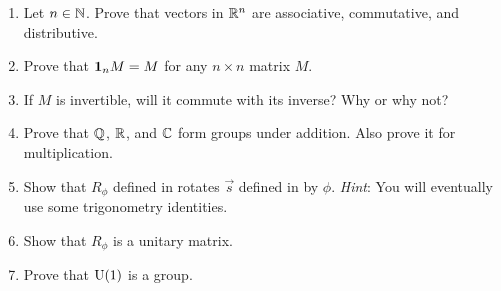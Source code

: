 \begin{enumerate} 
  \item Let $n\in\mathbb{N}$. Prove that vectors in $\mathbb{R}^n$ are associative, commutative,
        and distributive.
  \item Prove that ${\mathbf 1}_n M=M$ for any $n\times n$ matrix $M$.
  \item If $M$ is invertible, will it commute with its inverse? Why or why not?
  \item Prove that $\mathbb{Q}$, $\mathbb{R}$, and $\mathbb{C}$ form groups under addition. Also
        prove it for multiplication.
  \item Show that $R_\phi$ defined in  rotates $\vec{s}$ defined
        in  by $\phi$. {\it Hint}: You will eventually use some
        trigonometry identities.
  \item Show that $R_\phi$ is a unitary matrix.
  \item Prove that $\operatorname{U}(1)$ is a group.
\end{enumerate}




 

